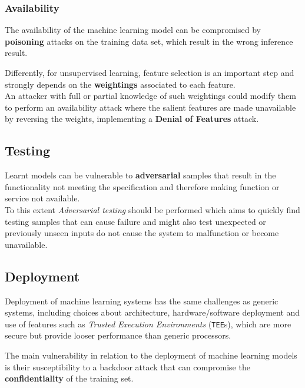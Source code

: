 \subsubsection{Availability}
The availability of the machine learning model can be compromised by
\textbf{poisoning} attacks on the training data set, which result in the wrong
inference result.

Differently, for unsupervised learning, feature selection is an important step and strongly depends on the \textbf{weightings} associated to each feature.\\
An attacker with full or partial knowledge of such weightings could
modify them to perform an availability attack where the salient
features are made unavailable by reversing the weights,
implementing a \textbf{Denial of Features} attack.

\subsection{Testing}
Learnt models can be vulnerable to \textbf{adversarial} samples that result in the
functionality not meeting the specification and therefore making function or service
not available.\\
To this extent \textit{Adversarial testing} should be performed which aims to quickly find testing samples that can cause failure
and might also test unexpected or previously unseen inputs do not cause the
system to malfunction or become unavailable.

\subsection{Deployment}
Deployment of machine learning systems has the same challenges as generic
systems, including choices about architecture, hardware/software deployment
and use of features such as \textit{Trusted Execution Environments} (\texttt{TEE}s),
which are more secure but provide looser performance than generic processors.


The main vulnerability in relation to the deployment of machine learning models
is their susceptibility to a backdoor attack that can compromise the
\textbf{confidentiality} of the training set.
